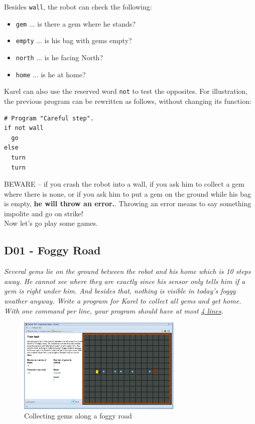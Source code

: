 \documentclass[article,A4,12pt]{llncs}
\begin{document}
Besides {\tt wall}, the robot can check the following:
\begin{itemize}
\item {\tt gem} ... is there a gem where he stands?
\item {\tt empty} ... is his bag with gems empty?
\item {\tt north} ... is he facing North?
\item {\tt home} ... is he at home?
\end{itemize}
Karel can also use the reserved word {\tt not} to test the opposites.
For illustration, the previous program can be rewritten as follows, without changing its function:
\begin{verbatim}
# Program "Careful step".
if not wall
  go
else
  turn
  turn
\end{verbatim}
BEWARE -- if you crash the robot into a wall, if you ask him to collect a gem where there
is none, or if you ask him to put a gem on the ground while 
his bag is empty, {\bf he will throw an error.}. Throwing an error 
means to say something impolite and go on strike!\\

\noindent
Now let's go play some games.

\subsection{D01 - Foggy Road}

{\em Several gems lie on the ground between the robot and his home which is 10 steps away. 
He cannot see where they are exactly since his sensor only tells him if a gem is right 
under him.  And besides that, nothing is visible in today's foggy weather anyway. 
Write a program for Karel to collect all gems and get home. With one command per 
line, your program should have at most \underline{4 lines}.}

\newpage

\begin{figure}[!ht]
\begin{center}
\includegraphics[width=0.7\textwidth]{img/d01.png}
\end{center}
\vspace{-4mm}
\caption{Collecting gems along a foggy road}
\label{fig:d01}
\vspace{-4mm}
\end{figure}
\noindent
\end{document}
